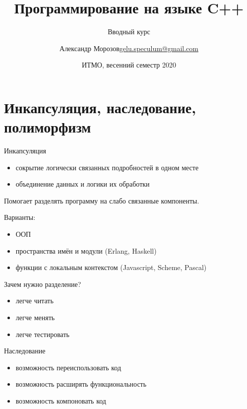 \documentclass[unknownkeysallowed,xcolor=table]{beamer}
\title[C++]
{Программирование на языке C++}
\subtitle{Вводный курс}
\author[А.~Б.~Морозов]
{
  \texorpdfstring{Александр Морозов\newline\href{mailto:gelu.speculum@gmail.com}{gelu.speculum@gmail.com}}
  {Александр Морозов}
}
\date[ITMO 2020]
{ИТМО, весенний семестр 2020}
\begin{document}
\frame{\titlepage}


\section{Инкапсуляция, наследование, полиморфизм}

\begin{frame}{Инкапсуляция}
  \begin{itemize}
    \item сокрытие логически связанных подробностей в одном месте
    \item объединение данных и логики их обработки
  \end{itemize}

  \vspace{1em}

  Помогает разделять программу на слабо связанные компоненты.

  \vspace{1em}

  Варианты:
  \begin{itemize}
    \item ООП
    \item пространства имён и модули (Erlang, Haskell)
    \item функции с локальным контекстом (Javascript, Scheme, Pascal)
  \end{itemize}
\end{frame}

\begin{frame}{Зачем нужно разделение?}
  \begin{itemize}
    \item легче читать \vspace{1em}
    \item легче менять \vspace{1em}
    \item легче тестировать
  \end{itemize}
\end{frame}

\begin{frame}{Наследование}
  \begin{itemize}
    \item возможность переиспользовать код \vspace{1em}
    \item возможность расширять функциональность \vspace{1em}
    \item возможность компоновать код
  \end{itemize}
\end{frame}
\end{document}
